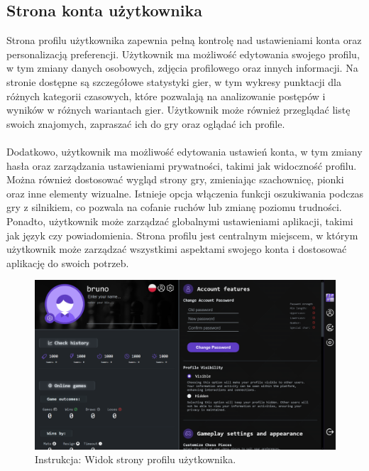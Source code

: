 \documentclass[12pt,a4paper]{article}
\begin{document}
\subsection{Strona konta użytkownika}
Strona profilu użytkownika zapewnia pełną kontrolę nad ustawieniami konta oraz personalizacją preferencji. Użytkownik ma możliwość edytowania swojego profilu, w tym zmiany danych osobowych, zdjęcia profilowego oraz innych informacji. Na stronie dostępne są szczegółowe statystyki gier, w tym wykresy punktacji dla różnych kategorii czasowych, które pozwalają na analizowanie postępów i wyników w różnych wariantach gier. Użytkownik może również przeglądać listę swoich znajomych, zapraszać ich do gry oraz oglądać ich profile.
\\\\
Dodatkowo, użytkownik ma możliwość edytowania ustawień konta, w tym zmiany hasła oraz zarządzania ustawieniami prywatności, takimi jak widoczność profilu. Można również dostosować wygląd strony gry, zmieniając szachownicę, pionki oraz inne elementy wizualne. Istnieje opcja włączenia funkcji oszukiwania podczas gry z silnikiem, co pozwala na cofanie ruchów lub zmianę poziomu trudności. Ponadto, użytkownik może zarządzać globalnymi ustawieniami aplikacji, takimi jak język czy powiadomienia. Strona profilu jest centralnym miejscem, w którym użytkownik może zarządzać wszystkimi aspektami swojego konta i dostosować aplikację do swoich potrzeb.

\vspace{0.5cm}
\begin{figure}[h!]
    \centering
    \includegraphics[width=1\textwidth]{images/ins_account.png}
    \caption{Instrukcja: Widok strony profilu użytkownika.}
\end{figure}

\newpage
\end{document}
